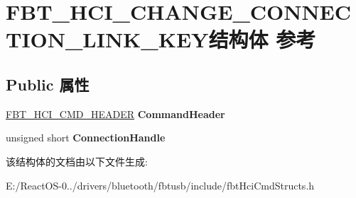 \hypertarget{struct_f_b_t___h_c_i___c_h_a_n_g_e___c_o_n_n_e_c_t_i_o_n___l_i_n_k___k_e_y}{}\section{F\+B\+T\+\_\+\+H\+C\+I\+\_\+\+C\+H\+A\+N\+G\+E\+\_\+\+C\+O\+N\+N\+E\+C\+T\+I\+O\+N\+\_\+\+L\+I\+N\+K\+\_\+\+K\+E\+Y结构体 参考}
\label{struct_f_b_t___h_c_i___c_h_a_n_g_e___c_o_n_n_e_c_t_i_o_n___l_i_n_k___k_e_y}
\subsection*{Public 属性}
\begin{DoxyCompactItemize}
\item 
\mbox{\label{struct_f_b_t___h_c_i___c_h_a_n_g_e___c_o_n_n_e_c_t_i_o_n___l_i_n_k___k_e_y_adb2b89b49be7378160eb32d84bbea424}} 
\hyperlink{struct_f_b_t___h_c_i___c_m_d___h_e_a_d_e_r}{F\+B\+T\+\_\+\+H\+C\+I\+\_\+\+C\+M\+D\+\_\+\+H\+E\+A\+D\+ER} {\bfseries Command\+Header}
\item 
\mbox{\label{struct_f_b_t___h_c_i___c_h_a_n_g_e___c_o_n_n_e_c_t_i_o_n___l_i_n_k___k_e_y_a5c1fee8b184951ef6d692fba8ca46041}} 
unsigned short {\bfseries Connection\+Handle}
\end{DoxyCompactItemize}


该结构体的文档由以下文件生成\+:\begin{DoxyCompactItemize}
\item 
E\+:/\+React\+O\+S-\/0../drivers/bluetooth/fbtusb/include/fbt\+Hci\+Cmd\+Structs.\+h\end{DoxyCompactItemize}
